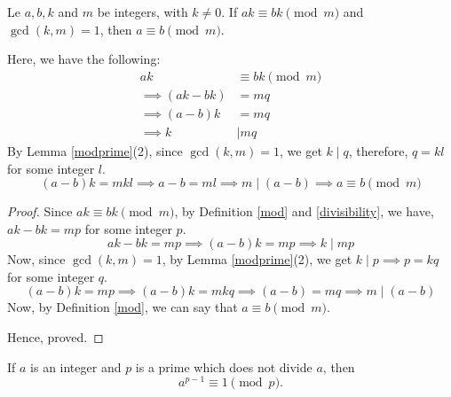 \begin{proposition}
	Le $a, b, k$ and $m$ be integers, with $k \neq 0$. If $ak \equiv bk \pmod m$ and $\gcd(k,m) = 1$, then $a \equiv b \pmod m$.
\end{proposition}

\begin{scratch}
	Here, we have the following:
	$$
	\begin{align}
		ak &\equiv bk \pmod m \\
		\implies (ak - bk) &= mq \\
		\implies (a-b)k &= mq \\
		\implies k &\mid mq
	\end{align}
	$$
	By Lemma \ref{modprime}(2), since $\gcd(k,m)=1$, we get $k \mid q$, therefore, $q = kl$ for some integer $l$.
	$$(a-b)k = mkl \implies a-b = ml \implies m \mid (a-b) \implies a \equiv b \pmod m$$
\end{scratch}

\begin{proof}
	Since $ak \equiv bk \pmod m$, by Definition \ref{mod} and \ref{divisibility}, we have, $ak - bk = mp$ for some integer $p$.
	$$ak-bk = mp \implies (a-b)k = mp \implies k \mid mp$$
	Now, since $\gcd(k,m) = 1$, by Lemma \ref{modprime}(2), we get $k \mid p \implies p = kq$ for some integer $q$.
	$$(a-b)k = mp \implies (a-b)k = mkq \implies (a-b) = mq \implies m \mid (a-b)$$
	Now, by Definition \ref{mod}, we can say that $a \equiv b \pmod m$.

	Hence, proved.
\end{proof}


\begin{theorem}
	If $a$ is an integer and $p$ is a prime which does not divide $a$, then 
	$$a^{p-1} \equiv 1 \pmod p.$$
\end{theorem}
